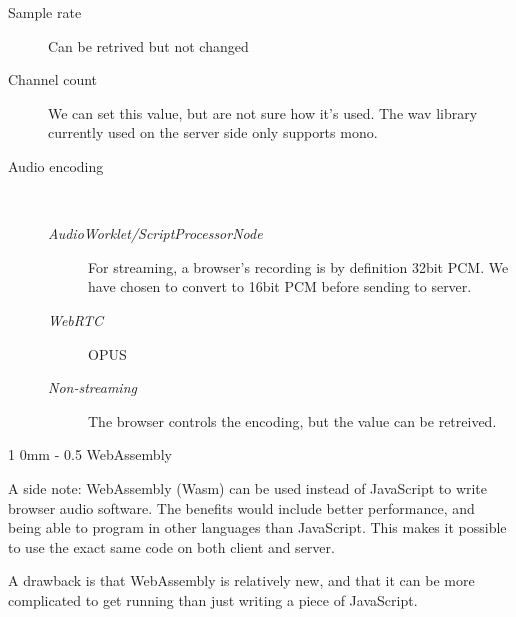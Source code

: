 \documentclass[11pt, a4paper, twoside]{article}
\makeatletter
\renewcommand{\section}{\@startsection
  {section}%
  {1}%
  {0mm}%
  {-\baselineskip}%
  {0.5\baselineskip}%
  {\bfseries\sffamily\Large}}%
\makeatother
\begin{document}
\begin{description}
\item[Sample rate] Can be retrived but not changed
\item[Channel count] We can set this value, but are not sure how it's used. The wav library currently used on the server side only supports mono.
\item[Audio encoding]\ \\[-14pt]
  \begin{description}
  \item[\em{AudioWorklet/ScriptProcessorNode}] For streaming, a browser's recording is by definition 32bit PCM. We have chosen to convert to 16bit PCM before sending to server.
  \item[\em{WebRTC}] OPUS
  \item[\em{ Non-streaming}] The browser controls the encoding, but the value can be retreived.
    
  \end{description}

\end{description}


\section{WebAssembly}

A side note: WebAssembly (Wasm) can be used instead of JavaScript to
write browser audio software. The benefits would include better
performance, and being able to program in other languages than
JavaScript. This makes it possible to use the exact same code on both
client and server.

A drawback is that WebAssembly is relatively new, and that it can be
more complicated to get running than just writing a piece of JavaScript.
\end{document}
